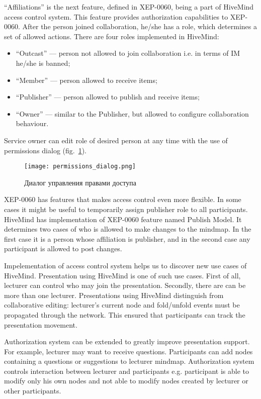 ``Affiliations'' is the next feature, defined in XEP-0060, being a part of
HiveMind access control system. This feature provides authorization capabilities
to XEP-0060. After the person joined collaboration, he/she has a role, which
determines a set of allowed actions. There are four roles implemented in
HiveMind:
\begin{itemize}
\item ``Outcast'' --- person not allowed to join collaboration i.e. in terms of
  IM he/she is banned;
\item ``Member'' --- person allowed to receive items;
\item ``Publisher'' --- person allowed to publish and receive items;
\item ``Owner'' --- similar to the Publisher, but allowed to configure
  collaboration behaviour.
\end{itemize}
Service owner can edit role of desired person at any time with the use of
permissions dialog (fig.~\ref{img:permissions_dialog}).

\begin{figure}[b] 
  \centering
  \texttt{[image: permissions\_dialog.png]}
  \caption{Диалог управления правами доступа}
  \label{img:permissions_dialog}
\end{figure}

XEP-0060 has features that makes access control even more flexible. In some
cases it might be useful to temporarily assign publisher role to all
participants. HiveMind has implementation of XEP-0060 feature named Publish
Model. It determines two cases of who is allowed to make changes to the
mindmap. In the first case it is a person whose affiliation is publisher, and in
the second case any participant is allowed to post changes.

Impelementation of access control system helps us to discover new use cases of
HiveMind. Presentation using HiveMind is one of such use cases. First of all,
lecturer can control who may join the presentation. Secondly, there are can be
more than one lecturer. Presentations using HiveMind distinguish from
collaborative editing: lecturer's current node and fold/unfold events must be
propagated through the network. This ensured that participants can track the
presentation movement.
 
Authorization system can be extended to greatly improve presentation
support. For example, lecturer may want to receive questions. Participants
can add nodes containing a questions or suggestions to lecturer mindmap.
Authorization system controls interaction between lecturer and participants e.g.
participant is able to modify only his own nodes and not able to modify nodes
created by lecturer or other participants.
